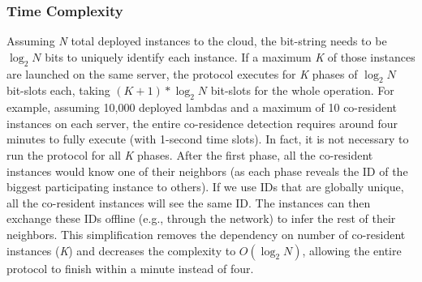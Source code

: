 \subsubsection{Time Complexity}
\label{sec:protocol:complexity}
Assuming \textit{N} total deployed instances to the cloud, the bit-string needs
to be $\log_2N$ bits to uniquely identify each instance. If a maximum \textit{K}
of those instances are launched on the same server, the protocol executes for
\textit{K} phases of $\log_2N$ bit-slots each, taking $(K+1)*\log_2N$ bit-slots
for the whole operation. For example, assuming 10,000 deployed lambdas and a
maximum of 10 co-resident instances on each server, the entire  co-residence
detection requires around four minutes to fully execute (with 1-second time
slots). In fact, it is not necessary to run the protocol for all \textit{K}
phases. After the first phase, all the co-resident instances would know one of
their neighbors (as each phase reveals the ID of the biggest participating
instance to others).  If we use IDs that are globally unique, all the
co-resident instances will see the same ID. The instances can then exchange these IDs
offline (e.g., through the network) to infer the rest of their neighbors. This
simplification removes the dependency on number of co-resident instances
(\textit{K}) and decreases the complexity to $O(\log_2N)$, allowing the entire
protocol to finish within a minute instead of four.



